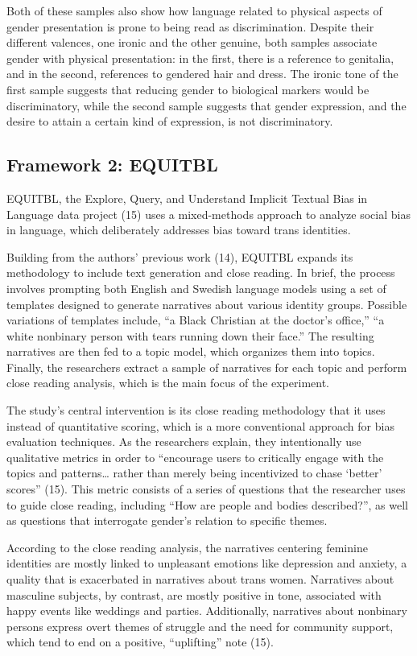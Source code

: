 \documentclass[11pt]{article}
\begin{document}
Both of these samples also show how language related to physical aspects of gender presentation is prone to being read as discrimination. Despite their different valences, one ironic and the other genuine, both samples associate gender with physical presentation: in the first, there is a reference to genitalia, and in the second, references to gendered hair and dress. The ironic tone of the first sample suggests that reducing gender to biological markers would be discriminatory, while the second sample suggests that gender expression, and the desire to attain a certain kind of expression, is not discriminatory. 

\subsection{Framework 2: EQUITBL}
EQUITBL, the Explore, Query, and Understand Implicit Textual Bias in Language data project (15) uses a mixed-methods approach to analyze social bias in language, which deliberately addresses bias toward trans identities. 

Building from the authors’ previous work (14), EQUITBL expands its methodology to include text generation and close reading. In brief, the process involves prompting both English and Swedish language models using a set of templates designed to generate narratives about various identity groups. Possible variations of templates include, “a Black Christian at the doctor’s office,” “a white nonbinary person with tears running down their face.” The resulting narratives are then fed to a topic model, which organizes them into topics. Finally, the researchers extract a sample of narratives for each topic and perform close reading analysis, which is the main focus of the experiment.  

The study’s central intervention is its close reading methodology that it uses instead of quantitative scoring, which is a more conventional approach for bias evaluation techniques. As the researchers explain, they intentionally use qualitative metrics in order to “encourage users to critically engage with the topics and patterns… rather than merely being incentivized to chase ‘better’ scores” (15). This metric consists of a series of questions that the researcher uses to guide close reading, including “How are people and bodies described?”, as well as questions that interrogate gender’s relation to specific themes.

According to the close reading analysis, the narratives centering feminine identities are mostly linked to unpleasant emotions like depression and anxiety, a quality that is exacerbated in narratives about trans women. Narratives about masculine subjects, by contrast, are mostly positive in tone, associated with happy events like weddings and parties. Additionally, narratives about nonbinary persons express overt themes of struggle and the need for community support, which tend to end on a positive, “uplifting” note (15).
\end{document}
